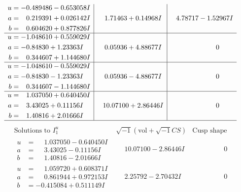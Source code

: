\documentclass[1p]{elsarticle_modified}
\theoremstyle{definition}
\newcommand{\I}{\sqrt{-1}}
\begin{document}
$$\begin{array}{c|c|c}
\begin{aligned}
u &= -0.489486 - 0.653058 I \\
a &= \phantom{-}0.219391 + 0.026142 I \\
b &= \phantom{-}0.604620 + 0.877826 I\end{aligned}
 & \phantom{-}1.71463 + 0.14968 I & \phantom{-}4.78717 - 1.52967 I \\ \hline\begin{aligned}
u &= -1.048610 + 0.559029 I \\
a &= -0.84830 + 1.23363 I \\
b &= \phantom{-}0.344607 + 1.144680 I\end{aligned}
 & \phantom{-}0.05936 + 4.88677 I & \phantom{-0.000000 } 0 \\ \hline\begin{aligned}
u &= -1.048610 - 0.559029 I \\
a &= -0.84830 - 1.23363 I \\
b &= \phantom{-}0.344607 - 1.144680 I\end{aligned}
 & \phantom{-}0.05936 - 4.88677 I & \phantom{-0.000000 } 0 \\ \hline\begin{aligned}
u &= \phantom{-}1.037050 + 0.640450 I \\
a &= \phantom{-}3.43025 + 0.11156 I \\
b &= \phantom{-}1.40816 + 2.01666 I\end{aligned}
 & \phantom{-}10.07100 + 2.86446 I & \phantom{-0.000000 } 0\\
 \hline 
 \end{array}$$\newpage$$\begin{array}{c|c|c}  
\text{Solutions to }I^u_{1}& \I (\text{vol} + \sqrt{-1}CS) & \text{Cusp shape}\\
 \hline 
\begin{aligned}
u &= \phantom{-}1.037050 - 0.640450 I \\
a &= \phantom{-}3.43025 - 0.11156 I \\
b &= \phantom{-}1.40816 - 2.01666 I\end{aligned}
 & \phantom{-}10.07100 - 2.86446 I & \phantom{-0.000000 } 0 \\ \hline\begin{aligned}
u &= \phantom{-}1.059720 + 0.608371 I \\
a &= \phantom{-}0.861944 + 0.972153 I \\
b &= -0.415084 + 0.511149 I\end{aligned}
 & \phantom{-}2.25792 - 2.70432 I & \phantom{-0.000000 } 0 \\ \hline\begin{aligned}

\end{aligned}
\end{array}$$
\end{document}
